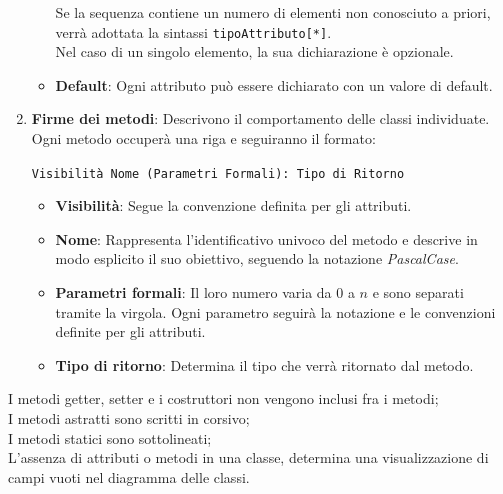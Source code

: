 \begin{enumerate}
\begin{itemize}
        Se la sequenza contiene un numero di elementi non conosciuto a priori, verrà adottata la sintassi \texttt{tipoAttributo[*]}. \\
        Nel caso di un singolo elemento, la sua dichiarazione è opzionale.
        \item \textbf{Default}: Ogni attributo può essere dichiarato con un valore di default.
    \end{itemize}
    \item \textbf{Firme dei metodi}: Descrivono il comportamento delle classi individuate. Ogni metodo occuperà una riga e seguiranno il formato: \\
    \begin{center} \texttt{Visibilità Nome (Parametri Formali): Tipo di Ritorno} \end{center}
    \begin{itemize}
        \item \textbf{Visibilità}: Segue la convenzione definita per gli attributi.
        \item \textbf{Nome}: Rappresenta l'identificativo univoco del metodo e descrive in modo esplicito il suo obiettivo, seguendo la notazione \textit{PascalCase}.
        \item \textbf{Parametri formali}: Il loro numero varia da $0$ a $n$ e sono separati tramite la virgola. Ogni parametro seguirà la notazione e le convenzioni definite per gli attributi.
        \item \textbf{Tipo di ritorno}: Determina il tipo che verrà ritornato dal metodo.
    \end{itemize}
\end{enumerate}

\vspace{15pt}

I metodi getter, setter e i costruttori non vengono inclusi fra i metodi;  \\
I metodi astratti sono scritti in corsivo; \\
I metodi statici sono sottolineati; \\
L'assenza di attributi o metodi in una classe, determina una visualizzazione di campi vuoti nel diagramma delle classi. \\ 

\vspace{15pt}

